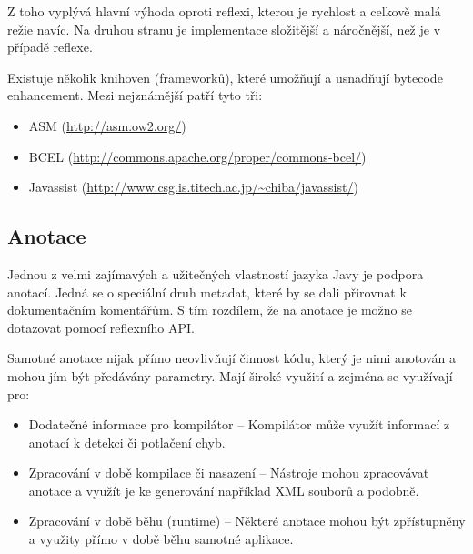Z toho vyplývá hlavní výhoda oproti reflexi, kterou je rychlost a celkově malá režie navíc. Na druhou stranu je implementace složitější a náročnější, než je v případě reflexe.

Existuje několik knihoven (frameworků), které umožňují a usnadňují bytecode enhancement. Mezi nejznámější patří tyto tři:
\begin{itemize}
  \item ASM (\url{http://asm.ow2.org/})
  \item BCEL (\url{http://commons.apache.org/proper/commons-bcel/})
  \item Javassist (\url{http://www.csg.is.titech.ac.jp/~chiba/javassist/})
\end{itemize}


\subsection{Anotace}
Jednou z velmi zajímavých a užitečných vlastností jazyka Javy je podpora anotací. Jedná se o speciální druh metadat, které by se dali přirovnat k dokumentačním komentářům. S tím rozdílem, že na anotace je možno se dotazovat pomocí reflexního API.

Samotné anotace nijak přímo neovlivňují činnost kódu, který je nimi anotován a mohou jím být předávány parametry. Mají široké využití a zejména se využívají pro:
\begin{itemize}
  \item Dodatečné informace pro kompilátor -- Kompilátor může využít informací z anotací k detekci či potlačení chyb.
  \item Zpracování v době kompilace či nasazení -- Nástroje mohou zpracovávat anotace a využít je ke generování například XML souborů a podobně.
  \item Zpracování v době běhu (runtime) -- Některé anotace mohou být zpřístupněny a využity přímo v době běhu samotné aplikace.
\end{itemize}

